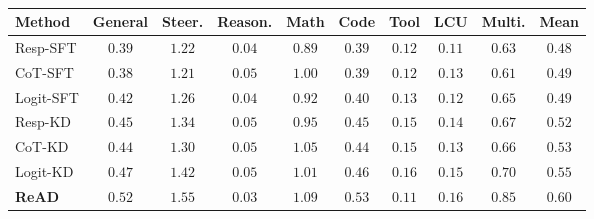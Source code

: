 \begin{table}[t]
  \centering
  \caption{}
  \label{tab:scaling}
  \scriptsize
  \setlength{\tabcolsep}{3pt}
  \begin{tabular}{@{}lccccccccc@{}}
    \toprule
    \textbf{Method} & \textbf{General} & \textbf{Steer.} & \textbf{Reason.} & \textbf{Math} & \textbf{Code} & \textbf{Tool} & \textbf{LCU} & \textbf{Multi.} & \textbf{Mean} \\
    \midrule
    Resp-SFT & $0.39$ & $1.22$ & $0.04$ & $0.89$ & $0.39$ & $0.12$ & $0.11$ & $0.63$ & $0.48$ \\
    CoT-SFT & $0.38$ & $1.21$ & $0.05$ & $1.00$ & $0.39$ & $0.12$ & $0.13$ & $0.61$ & $0.49$ \\
    Logit-SFT & $0.42$ & $1.26$ & $0.04$ & $0.92$ & $0.40$ & $0.13$ & $0.12$ & $0.65$ & $0.49$ \\
    Resp-KD & $0.45$ & $1.34$ & $0.05$ & $0.95$ & $0.45$ & $0.15$ & $0.14$ & $0.67$ & $0.52$ \\
    CoT-KD & $0.44$ & $1.30$ & $0.05$ & $1.05$ & $0.44$ & $0.15$ & $0.13$ & $0.66$ & $0.53$ \\
    Logit-KD & $0.47$ & $1.42$ & $\mathbf{0.05}$ & $1.01$ & $0.46$ & $\mathbf{0.16}$ & $0.15$ & $0.70$ & $0.55$ \\
    \textbf{ReAD} & $\mathbf{0.52}$ & $\mathbf{1.55}$ & $0.03$ & $\mathbf{1.09}$ & $\mathbf{0.53}$ & $0.11$ & $\mathbf{0.16}$ & $\mathbf{0.85}$ & $\mathbf{0.60}$ \\
    \bottomrule
  \end{tabular}
\end{table}
